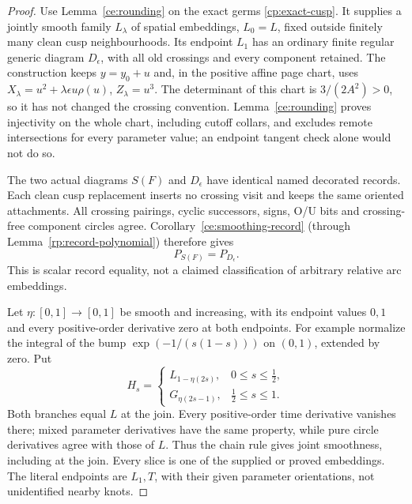 \begin{proof}\leanok{}
Use Lemma~\ref{ce:rounding} on the exact germs
\eqref{cp:exact-cusp}. It supplies a jointly smooth family $L_\lambda$
of spatial embeddings, $L_0=L$, fixed outside finitely many clean cusp
neighbourhoods. Its endpoint $L_1$ has an ordinary finite regular generic
diagram $D_\epsilon$, with all old crossings and every component retained.
The construction keeps $y=y_0+u$ and, in the positive affine page chart,
uses $X_\lambda=u^2+\lambda\epsilon u\rho(u)$, $Z_\lambda=u^3$.
The determinant of this chart is $3/(2A^2)>0$, so it has not changed the
crossing convention. Lemma~\ref{ce:rounding} proves injectivity on the
whole chart, including cutoff collars, and excludes remote intersections
for every parameter value; an endpoint tangent check alone would not do so.

The two actual diagrams $S(F)$ and $D_\epsilon$ have identical named
decorated records. Each clean cusp replacement inserts no crossing visit
and keeps the same oriented attachments. All crossing pairings, cyclic
successors, signs, O/U bits and crossing-free component circles agree.
Corollary~\ref{ce:smoothing-record} (through
Lemma~\ref{rp:record-polynomial}) therefore gives
\begin{equation}\label{cp:smoothing-record}
                    P_{S(F)}=P_{D_\epsilon}.
\end{equation}
This is scalar record equality, not a claimed classification of arbitrary
relative arc embeddings.

Let $\eta:[0,1]\to[0,1]$ be smooth and increasing, with its endpoint
values $0,1$ and every positive-order derivative zero at both endpoints.
For example normalize the integral of the bump
$\exp(-1/(s(1-s)))$ on $(0,1)$, extended by zero. Put
\begin{equation}\label{cp:flattened-family}
 H_s=\begin{cases}
       L_{1-\eta(2s)},&0\leq s\leq\tfrac12,\\
       G_{\eta(2s-1)},&\tfrac12\leq s\leq1.
      \end{cases}
\end{equation}
Both branches equal $L$ at the join. Every positive-order time derivative
vanishes there; mixed parameter derivatives have the same property,
while pure circle derivatives agree with those of $L$. Thus the chain
rule gives joint smoothness, including at the join. Every slice is one
of the supplied or proved embeddings. The literal endpoints are $L_1,T$,
with their given parameter orientations, not unidentified nearby knots.


\end{proof}
